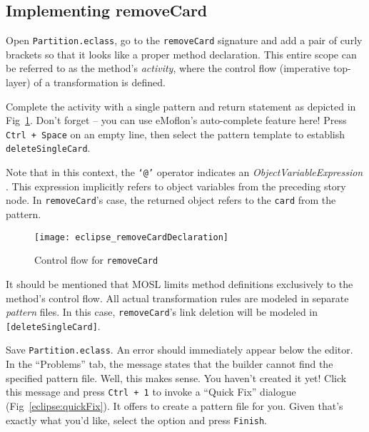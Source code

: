 \newpage
\hypertarget{remCard tex}{}
\subsection{Implementing removeCard}
\texHeader

\disclaimerForTextualSyntax

\begin{itemize}

\itemWithRightTriangle Open \texttt{Partition.eclass}, go to the
\texttt{removeCard} signature and add a pair of curly brackets so that it looks like a proper method declaration. This entire scope can be referred to as the method's \emph{activity}, where the control flow (imperative top-layer) of a
transformation is defined.

\itemWithRightTriangle Complete the activity with a single pattern and return statement as depicted in Fig~\ref{eclipse:remCardDec}. Don't forget -- you
can use eMoflon's auto-complete feature here! Press \texttt{Ctrl + Space} on an
empty line, then select the pattern template to establish \texttt{deleteSingleCard}.

\itemWithRightTriangle Note that in this context, the \texttt{`@'} operator indicates an \emph{ObjectVariableExpression}%
. This expression implicitly refers to object variables from the preceding story node. In \texttt{removeCard}'s case, the
returned object refers to the \texttt{card} from the pattern.

\vspace{0.5cm}

\begin{figure}[htp]
\begin{center}
  \texttt{[image: eclipse\_removeCardDeclaration]}
  \caption{Control flow for \texttt{removeCard}}
  \label{eclipse:remCardDec}
\end{center}
\end{figure}

\itemWithRightTriangle It should be mentioned that MOSL limits method definitions exclusively to the method's control flow. All actual transformation
rules are modeled in separate \emph{pattern} files. In this case, \texttt{removeCard}'s link deletion will be modeled in \texttt{[deleteSingleCard]}.

\vspace{0.5cm}

\itemWithRightTriangle Save \texttt{Partition.eclass}. An error should immediately appear below the editor. In the ``Problems'' tab, the message
states that the builder cannot find the specified pattern file. Well, this makes sense. You haven't created it yet! Click this message and press \texttt{Ctrl +
1} to invoke a ``Quick Fix'' dialogue (Fig~\ref{eclipse:quickFix}). It offers to create a pattern file for you. Given that's exactly what you'd like, select the
option and press \texttt{Finish}.


\end{itemize}
